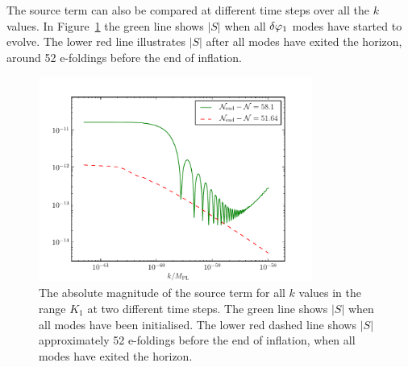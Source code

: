 The source term can also be compared at different time steps over all the $k$ values.
In Figure~\ref{fig:src-3ns} the green
line shows $|S|$ when all $\delta\varphi_{1}$ modes have started to evolve. The lower
red line illustrates $|S|$
after all modes have exited the horizon, around 52 e-foldings before the end of
inflation.
% 
\begin{figure}[htbp]
\centering
\includegraphics[width=0.8\textwidth]{numerical/graphs/src_3ns-large}
\caption[Source Term at Two Different Times]{The absolute magnitude of the source 
term for all $k$ values in the range $K_1$ at two different time steps. The green line shows
$|S|$ when all modes have been initialised. The lower red dashed line shows $|S|$ approximately 
52 e-foldings before the end of inflation, when all modes have
exited the horizon.}
\label{fig:src-3ns}
\end{figure}
% 


